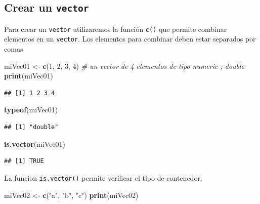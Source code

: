 \documentclass[]{book}
\newenvironment{Shaded}{\begin{snugshade}}{\end{snugshade}}
\newcommand{\KeywordTok}[1]{\textcolor[rgb]{0.13,0.29,0.53}{\textbf{#1}}}
\newcommand{\DecValTok}[1]{\textcolor[rgb]{0.00,0.00,0.81}{#1}}
\newcommand{\StringTok}[1]{\textcolor[rgb]{0.31,0.60,0.02}{#1}}
\newcommand{\CommentTok}[1]{\textcolor[rgb]{0.56,0.35,0.01}{\textit{#1}}}
\newcommand{\NormalTok}[1]{#1}
\begin{document}
\subsection{\texorpdfstring{Crear un
\texttt{vector}}{Crear un vector}}\label{crear-un-vector}

Para crear un \texttt{vector} utilizaremos la función \texttt{c()} que
permite combinar elementos en un \texttt{vector}. Los elementos para
combinar deben estar separados por comas.

\begin{Shaded}
\begin{Highlighting}[]
\NormalTok{miVec01 <-}\StringTok{ }\KeywordTok{c}\NormalTok{(}\DecValTok{1}\NormalTok{, }\DecValTok{2}\NormalTok{, }\DecValTok{3}\NormalTok{, }\DecValTok{4}\NormalTok{) }\CommentTok{# un vector de 4 elementos de tipo numeric ; double}
\KeywordTok{print}\NormalTok{(miVec01)}
\end{Highlighting}
\end{Shaded}

\begin{verbatim}
## [1] 1 2 3 4
\end{verbatim}

\begin{Shaded}
\begin{Highlighting}[]
\KeywordTok{typeof}\NormalTok{(miVec01)}
\end{Highlighting}
\end{Shaded}

\begin{verbatim}
## [1] "double"
\end{verbatim}

\begin{Shaded}
\begin{Highlighting}[]
\KeywordTok{is.vector}\NormalTok{(miVec01)}
\end{Highlighting}
\end{Shaded}

\begin{verbatim}
## [1] TRUE
\end{verbatim}

La funcion \texttt{is.vector()} permite verificar el tipo de contenedor.

\begin{Shaded}
\begin{Highlighting}[]
\NormalTok{miVec02 <-}\StringTok{ }\KeywordTok{c}\NormalTok{(}\StringTok{"a"}\NormalTok{, }\StringTok{"b"}\NormalTok{, }\StringTok{"c"}\NormalTok{) }
\KeywordTok{print}\NormalTok{(miVec02)}
\end{Highlighting}
\end{Shaded}
\end{document}
